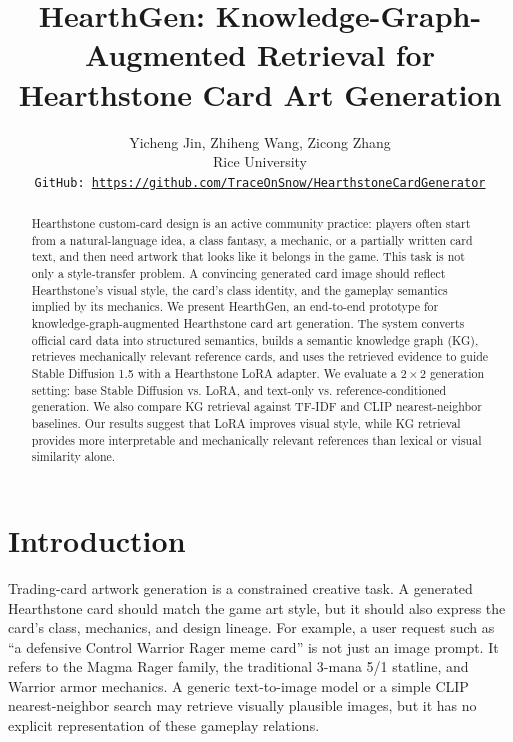 \documentclass[10pt,twocolumn,letterpaper]{article}
\begin{document}
\title{HearthGen: Knowledge-Graph-Augmented Retrieval for Hearthstone Card Art Generation}

\author{Yicheng Jin, Zhiheng Wang, Zicong Zhang\\
Rice University\\
{\tt\small GitHub: \url{https://github.com/TraceOnSnow/HearthstoneCardGenerator}}
}

\maketitle

\begin{abstract}
  Hearthstone custom-card design is an active community practice: players often start from a natural-language idea, a class fantasy, a mechanic, or a partially written card text, and then need artwork that looks like it
  belongs in the game. This task is not only a style-transfer problem. A convincing generated card image should reflect Hearthstone's visual style, the card's class identity, and the gameplay semantics implied by its
  mechanics. We present HearthGen, an end-to-end prototype for knowledge-graph-augmented Hearthstone card art generation. The system converts official card data into structured semantics, builds a semantic knowledge graph
  (KG), retrieves mechanically relevant reference cards, and uses the retrieved evidence to guide Stable Diffusion 1.5 with a Hearthstone LoRA adapter. We evaluate a $2\times2$ generation setting: base Stable Diffusion vs.
  LoRA, and text-only vs. reference-conditioned generation. We also compare KG retrieval against TF-IDF and CLIP nearest-neighbor baselines. Our results suggest that LoRA improves visual style, while KG retrieval provides
  more interpretable and mechanically relevant references than lexical or visual similarity alone.
  \end{abstract}

\section{Introduction}

Trading-card artwork generation is a constrained creative task. A generated Hearthstone card should match the game art style, but it should also express the card's class, mechanics, and design lineage. For example, a user request such as ``a defensive Control Warrior Rager meme card'' is not just an image prompt. It refers to the Magma Rager family, the traditional 3-mana 5/1 statline, and Warrior armor mechanics. A generic text-to-image model or a simple CLIP nearest-neighbor search may retrieve visually plausible images, but it has no explicit representation of these gameplay relations.
\end{document}
